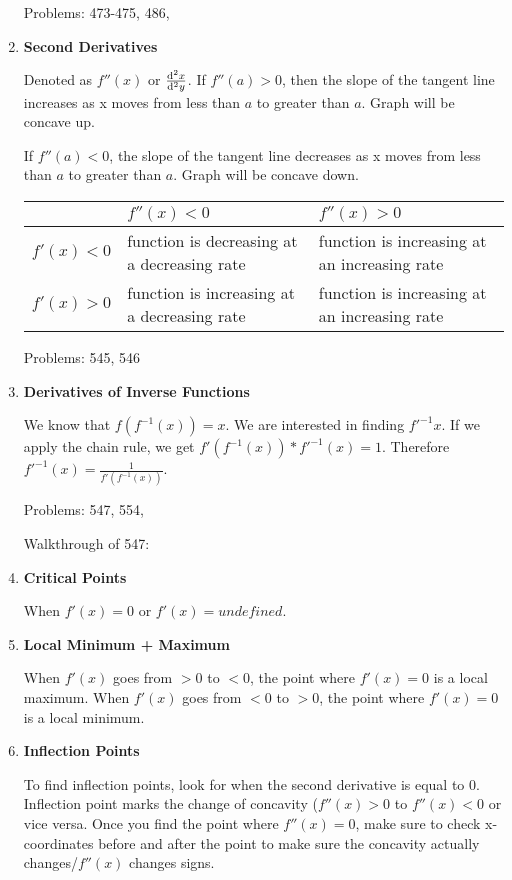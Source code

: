 \documentclass[11pt,twoside]{article}
\begin{document}
\begin{enumerate}
Problems: 473-475, 486, 

\item \textbf{Second Derivatives}

Denoted as $f''(x)$ or $\frac{\odif[order={2}]{x}}{\odif[order={2}]{y}}$. 
If $f''(a) > 0$, then the slope of the tangent line increases as x moves from less than $a$ to greater than $a$. Graph will be concave up.

If $f''(a) < 0$, the slope of the tangent line decreases as x moves from less than $a$ to greater than $a$. Graph will be concave down.

\begin{center}
\begin{tabularx}{0.8\textwidth} {
| >{\raggedright\arraybackslash}X 
| >{\centering\arraybackslash}X 
| >{\raggedleft\arraybackslash}X |}
\hline
& $f''(x) < 0$ & $f''(x) > 0$ \\
\hline
$f'(x) < 0$ & function is decreasing at a decreasing rate & function is increasing at an increasing rate\\ 
\hline
$f'(x) > 0$ & function is increasing at a decreasing rate & function is increasing at an increasing rate \\
\hline
\end{tabularx}
\end{center}

Problems: 545, 546

\item \textbf{Derivatives of Inverse Functions}

We know that $f(f^{-1}(x)) = x$. We are interested in finding $f'^{-1}x$. If we apply the chain rule, we get $f'(f^{-1}(x)) * f'^{-1}(x) = 1$. Therefore
$f'^{-1}(x) = \frac{1}{f'(f^{-1}(x))}$.

Problems: 547, 554, 

Walkthrough of 547:


\item \textbf{Critical Points}

When $f'(x) = 0$ or $f'(x) = undefined$. 

\item \textbf{Local Minimum + Maximum}

When $f'(x)$ goes from $ > 0$ to $ < 0$, the point where $f'(x) = 0$ is a local maximum. When $f'(x)$ goes from $ < 0$ to $ > 0$, the point where $f'(x) = 0$ is a local minimum. 

\item \textbf{Inflection Points}

To find inflection points, look for when the second derivative is equal to 0. Inflection point marks the change of concavity ($f''(x) > 0$ to $f''(x) < 0$ or vice versa. Once you find the point where $f''(x) = 0$, make sure to check x-coordinates before and after the point to make sure the concavity actually changes/$f''(x)$ changes signs. 


\end{enumerate}
\end{document}
